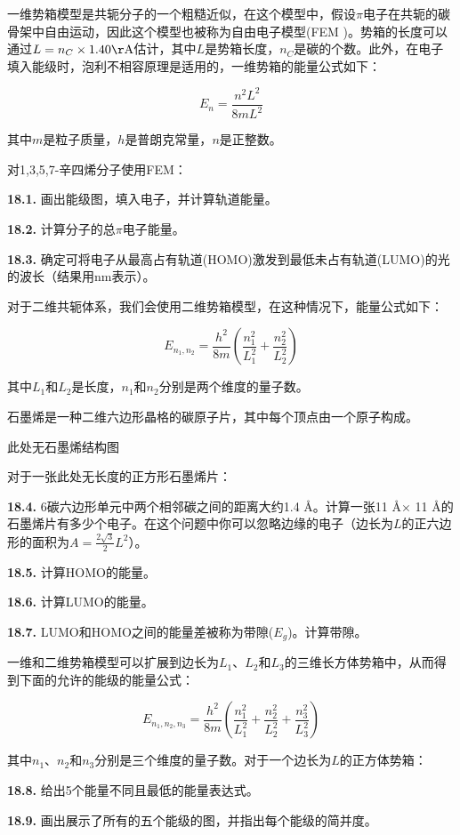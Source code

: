 一维势箱模型是共轭分子的一个粗糙近似，在这个模型中，假设$\pi$电子在共轭的碳骨架中自由运动，因此这个模型也被称为自由电子模型(FEM )。势箱的长度可以通过$L=n_C\times1.40\mathrm{\AA}$估计，其中$L$是势箱长度，$n_C$是碳的个数。此外，在电子填入能级时，泡利不相容原理是适用的，一维势箱的能量公式如下：

$$
E_n=\frac{n^2L^2}{8mL^2}
$$

\noindent 其中$m$是粒子质量，$h$是普朗克常量，$n$是正整数。

对1,3,5,7-辛四烯分子使用FEM：

\noindent\textbf{18.1.} 画出能级图，填入电子，并计算轨道能量。

\noindent\textbf{18.2.} 计算分子的总$\pi$电子能量。

\noindent\textbf{18.3.}
确定可将电子从最高占有轨道(HOMO)激发到最低未占有轨道(LUMO)的光的波长（结果用nm表示）。

对于二维共轭体系，我们会使用二维势箱模型，在这种情况下，能量公式如下：

$$
E_{n_1,n_2}=\frac{h^2}{8m}\left(\frac{n^2_1}{L_1^2}+\frac{n^2_2}{L_2^2}\right)
$$

\noindent 其中$L_1$和$L_2$是长度，$n_1$和$n_2$分别是两个维度的量子数。

石墨烯是一种二维六边形晶格的碳原子片，其中每个顶点由一个原子构成。

此处无石墨烯结构图

对于一张此处无长度的正方形石墨烯片：

\noindent\textbf{18.4.}
6碳六边形单元中两个相邻碳之间的距离大约1.4 \AA。计算一张11 \AA $\times$ 11 \AA 的石墨烯片有多少个电子。在这个问题中你可以忽略边缘的电子（边长为$L$的正六边形的面积为$A=\frac{2\sqrt3}{2}L^2$）。

\noindent\textbf{18.5.} 计算HOMO的能量。

\noindent\textbf{18.6.} 计算LUMO的能量。

\noindent\textbf{18.7.}
LUMO和HOMO之间的能量差被称为带隙($E_g$)。计算带隙。

一维和二维势箱模型可以扩展到边长为$L_1$、$L_2$和$L_3$的三维长方体势箱中，从而得到下面的允许的能级的能量公式：

$$
E_{n_1,n_2,n_3}=\frac{h^2}{8m}\left(\frac{n^2_1}{L_1^2}+\frac{n^2_2}{L_2^2}+\frac{n^2_3}{L_3^2}\right)
$$

其中$n_1$、$n_2$和$n_3$分别是三个维度的量子数。对于一个边长为$L$的正方体势箱：

\noindent\textbf{18.8.} 给出5个能量不同且最低的能量表达式。

\noindent\textbf{18.9.} 画出展示了所有的五个能级的图，并指出每个能级的简并度。
